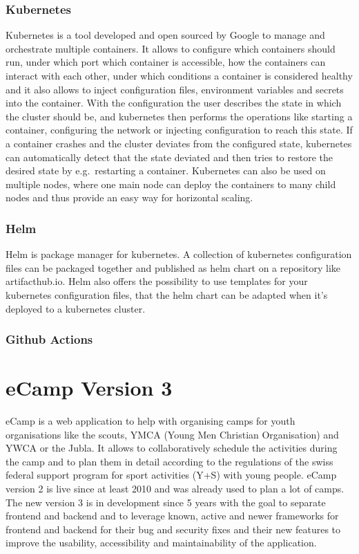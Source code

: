 \documentclass[conference]{IEEEtran}
\begin{document}
\subsubsection{Kubernetes}

Kubernetes is a tool developed and open sourced by Google to manage and orchestrate multiple containers.
It allows to configure which containers should run, under which port which container is accessible,
how the containers can interact with each other, under which conditions a container is considered healthy and it also allows
to inject configuration files, environment variables and secrets into the container.
With the configuration the user describes the state in which the cluster should be, and kubernetes then performs the
operations like starting a container, configuring the network or injecting configuration to reach this state.
If a container crashes and the cluster deviates from the configured state, kubernetes can automatically detect that
the state deviated and then tries to restore the desired state by e.g.\ restarting a container.
Kubernetes can also be used on multiple nodes, where one main node can deploy the containers to many child nodes
and thus provide an easy way for horizontal scaling.

\subsubsection{Helm}

Helm is package manager for kubernetes\cite{helm-website}.
A collection of kubernetes configuration files can be packaged together and published as helm chart on a repository
like artifacthub.io\cite{artifacthub-io}.
Helm also offers the possibility to use templates for your kubernetes configuration files, that the helm chart
can be adapted when it's deployed to a kubernetes cluster.

\subsubsection{Github Actions}

\section{eCamp Version 3}

eCamp is a web application to help with organising camps for youth organisations like the
scouts, YMCA (Young Men Christian Organisation)\cite{ymca-website} and YWCA or the Jubla.
It allows to collaboratively schedule the activities during the camp and to plan them in detail
according to the regulations of the swiss federal support program for sport activities (Y+S) with young people\cite{J+S-Website,ecamp3-website}.
eCamp version 2 is live since at least 2010\cite{ecamp2-first-commit} and was already used to plan a lot of camps.
The new version 3 is in development since 5 years\cite{ecamp3-website} with the goal to separate frontend and backend and
to leverage known, active and newer frameworks for frontend and backend for their bug and security fixes and
their new features to improve the usability, accessibility and maintainability of the application.
\end{document}
